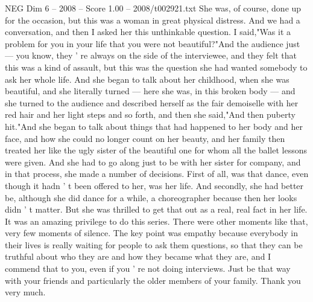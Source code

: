 \begin{textsample}{NEG Dim 6 – 2008 – Score 1.00 – 2008/t002921.txt}
She was, of course, done up for the occasion, but this was a woman in great physical distress.
And we had a conversation, and then I asked her this unthinkable question.
I said,"Was it a problem for you in your life that you were not beautiful?"And the audience just — you know, they ' re always on the side of the interviewee, and they felt that this was a kind of assault, but this was the question she had wanted somebody to ask her whole life.
And she began to talk about her childhood, when she was beautiful, and she literally turned — here she was, in this broken body — and she turned to the audience and described herself as the fair demoiselle with her red hair and her light steps and so forth, and then she said,"And then puberty hit."And she began to talk about things that had happened to her body and her face, and how she could no longer count on her beauty, and her family then treated her like the ugly sister of the beautiful one for whom all the ballet lessons were given.
And she had to go along just to be with her sister for company, and in that process, she made a number of decisions.
First of all, was that dance, even though it hadn ' t been offered to her, was her life.
And secondly, she had better be, although she did dance for a while, a choreographer because then her looks didn ' t matter.
But she was thrilled to get that out as a real, real fact in her life.
It was an amazing privilege to do this series.
There were other moments like that, very few moments of silence.
The key point was empathy because everybody in their lives is really waiting for people to ask them questions, so that they can be truthful about who they are and how they became what they are, and I commend that to you, even if you ' re not doing interviews.
Just be that way with your friends and particularly the older members of your family.
Thank you very much.

\end{textsample}
